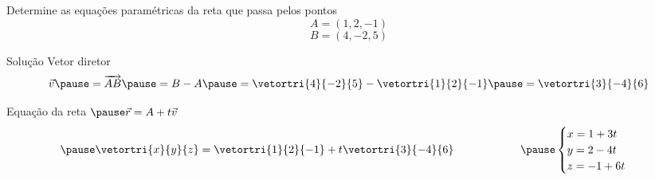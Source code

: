 \begin{question}
  Determine as equações paramétricas da reta que passa pelos pontos
  \[
    A = (1, 2, -1)
  \]
  \[
    B = (4, -2, 5)
  \]
\end{question}

\begin{resolution}{Solução}
  Vetor diretor
  \pause
  \[
    \vec{v}
    \pause
    = \overrightarrow{AB}
    \pause
    = B - A
    \pause
    = \vetortri{4}{-2}{5} - \vetortri{1}{2}{-1}
    \pause
    = \vetortri{3}{-4}{6}
  \]

  \pause
  Equação da reta
  \(
    \pause
    \vec{r} = A + t\vec{v}
  \)
  \[
    \pause
    \vetortri{x}{y}{z} = \vetortri{1}{2}{-1} + t\vetortri{3}{-4}{6}
  \qquad\qquad\qquad
    \pause
    \begin{cases}
      x =  1 + 3t \\
      y =  2 - 4t \\
      z = -1 + 6t
    \end{cases}
  \]
\end{resolution}

\endinput
